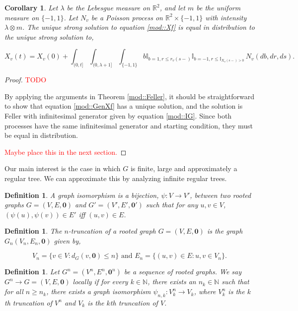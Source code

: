 \documentclass[12pt]{article}
\newcommand{\mb}{\mathbb}
\newcommand{\ra}{\rightarrow}
\newcommand{\te}{\text}
\newcommand{\tr}{\textcolor{red}}
\renewcommand{\root}{\mathbf{0}}
\newcommand{\Xf}{X}									%
\newcommand{\poiss}{N}								%
\newcommand{\leb}{\lambda}							%
\newcommand{\poissv}[1]{_{#1}}						%
\newcommand{\vind}[1]{_{#1}}						%
\newcommand{\tme}[1]{(#1)}							%
\newcommand{\arr}{\lambda}							%
\newcommand{\uni}{m}
\newtheorem{coro}[thms]{Corollary}
\newtheorem{defn}[thms]{Definition}
\begin{document}
\begin{coro}
Let \(\leb\) be the Lebesgue measure on \(\mb{R}^2\), and let \(\uni\) be the uniform measure on \(\{-1,1\}\). Let \(\poiss\poissv{v}\) be a Poisson process on \(\mb{R}^2\times \{-1,1\}\) with intensity \(\leb \otimes \uni\). The unique strong solution to equation \eqref{mod::Xf} is equal in distribution to the unique strong solution to,

\begin{equation}
\Xf\vind{v}\tme{t} = \Xf\vind{v}\tme{0} + \int_{(0,t]}\int_{(0,\arr+1]} \int_{\{-1,1\}} b\mb{I}_{b=1,r \leq r\vind{v}\tme{s-}}\mb{I}_{b=-1,r \leq \mb{I}_{\Xf\vind{v}\tme{s-} > 0}}\,\poiss\poissv{v}(db,dr,ds).
\label{mod::GenXf}
\end{equation}
\label{mod::General}
\end{coro}
\begin{proof}
\tr{TODO}

By applying the arguments in Theorem \ref{mod::Feller}, it should be straightforward to show that equation \eqref{mod::GenXf} has a unique solution, and the solution is Feller with infinitesimal generator given by equation \eqref{mod::IG}. Since both processes have the same infinitesimal generator and starting condition, they must be equal in distribution.

\tr{Maybe place this in the next section.}
\end{proof}

Our main interest is the case in which \(G\) is finite, large and approximately a regular tree. We can approximate this by analyzing infinite regular trees.

\begin{defn}
A graph isomorphism is a bijection, \(\psi: V \ra V'\), between two rooted graphs \(G = (V,E,\root)\) and \(G' = (V',E',\root')\) such that for any \(u,v \in V\), \((\psi(u),\psi(v)) \in E'\) iff \((u,v) \in E\).
\label{mod::iso}
\end{defn}

\begin{defn}
The \(n\)-truncation of a rooted graph \(G = (V,E,\root)\) is the graph \(G_n(V_n,E_n,\root)\) given by,

\[V_n = \{v \in V: d_G(v,\root) \leq n\} \te{ and } E_n = \{(u,v) \in E: u,v \in V_n\}.\]
\label{mod::trunc}
\end{defn}

\begin{defn}
Let \(G^n = (V^n,E^n,\root^n)\) be a sequence of rooted graphs. We say \(G^n \ra G = (V,E,\root)\) locally if for every \(k\in \mb{N}\), there exists an \(n_k \in \mb{N}\) such that for all \(n \geq n_k\), there exists a graph isomorphism \(\psi_{n,k}: V^n_k \ra V_k\), where \(V^n_k\) is the \(k\)th truncation of \(V^n\) and \(V_k\) is the \(k\)th truncation of \(V\).
\label{mod::locconv}
\end{defn}
\end{document}
